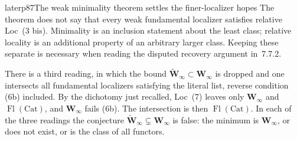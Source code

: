 \begin{dcomment}{later}{p87}{The weak minimality theorem settles the finer-localizer hopes}
The theorem does not say that every weak fundamental localizer satisfies relative Loc~(3 bis). Minimality is an inclusion statement about the least class; relative locality is an additional property of an arbitrary larger class. Keeping these separate is necessary when reading the disputed recovery argument in~7.7.2.

There is a third reading, in which the bound $\widetilde{\mathbf W}_\infty\subset\mathbf W_\infty$ is dropped and one intersects all fundamental localizers satisfying the literal list, reverse condition (6b) included. By the dichotomy just recalled, Loc~(7) leaves only $\mathbf W_\infty$ and $\operatorname{Fl}(\mathrm{Cat})$, and $\mathbf W_\infty$ fails (6b). The intersection is then $\operatorname{Fl}(\mathrm{Cat})$. In each of the three readings the conjecture $\widetilde{\mathbf W}_\infty\subsetneq\mathbf W_\infty$ is false: the minimum is $\mathbf W_\infty$, or does not exist, or is the class of all functors.
\end{dcomment}

